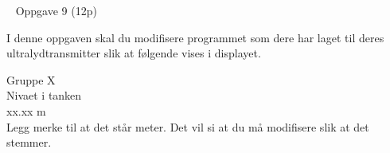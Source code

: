 \newpage
\
\newpage
Oppgave 9 (12p)

\vskip 5pt 

I denne oppgaven skal du modifisere programmet som dere har laget til deres ultralydtransmitter slik at følgende vises i displayet. 
\vskip 10pt 

Gruppe X\\
Nivaet i tanken \\
xx.xx m\\


\vskip 5pt 
Legg merke til at det står meter. Det vil si at du må modifisere slik at det stemmer. 

